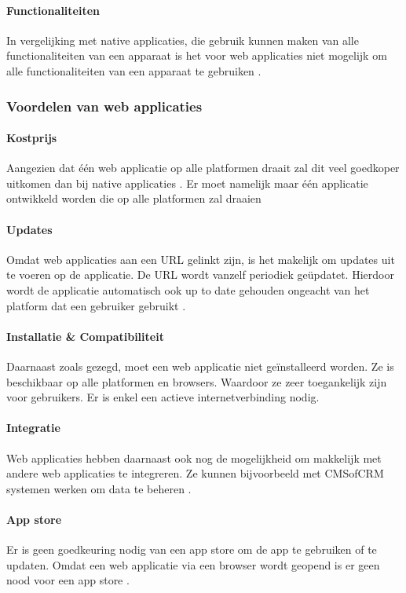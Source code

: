 \paragraph{Functionaliteiten}
In vergelijking met native applicaties, die gebruik kunnen maken van alle functionaliteiten van een 
apparaat is het voor web applicaties niet mogelijk om alle functionaliteiten van een apparaat te gebruiken 
\autocite{Laarhoven2021}.

\subsubsection{Voordelen van web applicaties}\label{ch:VoordelenWebApplicaties}
\paragraph{Kostprijs}
Aangezien dat één web applicatie op alle platformen draait zal dit veel goedkoper uitkomen dan bij native 
applicaties \autocite{Laarhoven2021}. Er moet namelijk maar één applicatie ontwikkeld worden die op alle 
platformen zal draaien

\paragraph{Updates}
Omdat web applicaties aan een URL gelinkt zijn, is het makelijk om updates uit te voeren op de applicatie. 
De URL wordt vanzelf periodiek geüpdatet. Hierdoor wordt de applicatie automatisch ook up to date gehouden 
ongeacht van het platform dat een gebruiker gebruikt \autocite{Varsha2023}.

\paragraph{Installatie \& Compatibiliteit}
Daarnaast zoals gezegd, moet een web applicatie niet geïnstalleerd worden. Ze is beschikbaar op alle 
platformen en browsers. Waardoor ze zeer toegankelijk zijn voor gebruikers. Er is enkel een actieve 
internetverbinding nodig.

\paragraph{Integratie}
Web applicaties hebben daarnaast ook nog de mogelijkheid om makkelijk met andere web applicaties te integreren. 
Ze kunnen bijvoorbeeld met \Gls{CMSofCRM} systemen werken om data te beheren \autocite{Nehra2023}.

\paragraph{App store}
Er is geen goedkeuring nodig van een app store om de app te gebruiken of te updaten. Omdat een web applicatie 
via een browser wordt geopend is er geen nood voor een app store \autocite{Varsha2023}.

